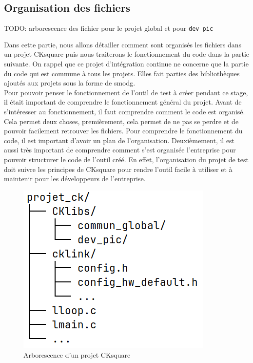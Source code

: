 \documentclass[a4paper]{article}
\begin{document}
\subsection{Organisation des fichiers}
\label{orgaprojck}

TODO: arborescence des fichier pour le projet global et pour \verb|dev_pic|

Dans cette partie, nous allons détailler comment sont organisés les fichiers
dans un projet CKsquare puis nous traiterons le fonctionnement du code dans la
partie suivante. On rappel que ce projet d'intégration continue ne concerne que
la partie du code qui est commune à tous les projets. Elles fait parties des
bibliothèques ajoutés aux projets sous la forme de \gls{smodg}. \\

Pour pouvoir penser le fonctionnement de l'outil de test à créer pendant ce
stage, il était important de comprendre le fonctionnement général du projet.
Avant de s'intéresser au fonctionnement, il faut comprendre comment le code est
organisé. Cela permet deux choses, premièrement, cela permet de ne pas se perdre
et de pouvoir facilement retrouver les fichiers. Pour comprendre le
fonctionnement du code, il est important d'avoir un plan de l'organisation.
Deuxièmement, il est aussi très important de comprendre comment s'est organisée
l'entreprise pour pouvoir structurer le code de l'outil créé. En
effet, l'organisation du projet de test doit suivre les principes de CKsquare
pour rendre l'outil facile à utiliser et à maintenir pour les développeurs de
l'entreprise.

\begin{figure}[h!]
  \begin{center}
    \includegraphics[scale=0.5]{./img/arborescence-proj.png}
    \caption{Arborescence d'un projet CKsquare}
    \label{fig:arbrprojck}
  \end{center}
\end{figure}
\end{document}
